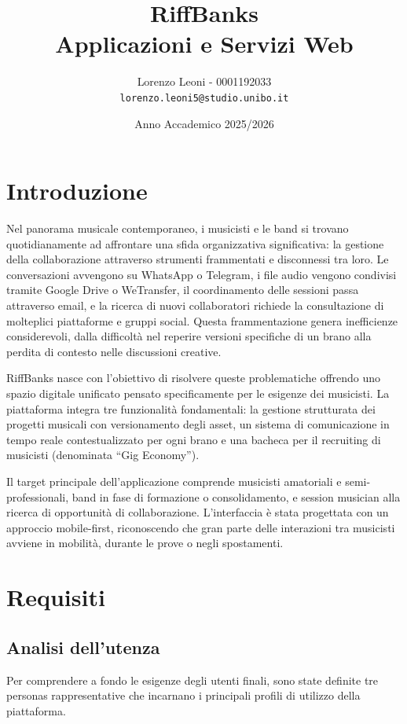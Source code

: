\documentclass{report}
\title{
    RiffBanks\\
    \large Applicazioni e Servizi Web
}
\author{Lorenzo Leoni - 0001192033 \\ \texttt{lorenzo.leoni5@studio.unibo.it}}
\date{Anno Accademico 2025/2026}
\begin{document}
\maketitle

\tableofcontents
\newpage

\chapter{Introduzione}

Nel panorama musicale contemporaneo, i musicisti e le band si trovano quotidianamente ad affrontare una sfida organizzativa significativa: la gestione della collaborazione attraverso strumenti frammentati e disconnessi tra loro. Le conversazioni avvengono su WhatsApp o Telegram, i file audio vengono condivisi tramite Google Drive o WeTransfer, il coordinamento delle sessioni passa attraverso email, e la ricerca di nuovi collaboratori richiede la consultazione di molteplici piattaforme e gruppi social. Questa frammentazione genera inefficienze considerevoli, dalla difficoltà nel reperire versioni specifiche di un brano alla perdita di contesto nelle discussioni creative.

RiffBanks nasce con l'obiettivo di risolvere queste problematiche offrendo uno spazio digitale unificato pensato specificamente per le esigenze dei musicisti. La piattaforma integra tre funzionalità fondamentali: la gestione strutturata dei progetti musicali con versionamento degli asset, un sistema di comunicazione in tempo reale contestualizzato per ogni brano e una bacheca per il recruiting di musicisti (denominata ``Gig Economy'').

Il target principale dell'applicazione comprende musicisti amatoriali e semi-professionali, band in fase di formazione o consolidamento, e session musician alla ricerca di opportunità di collaborazione. L'interfaccia è stata progettata con un approccio mobile-first, riconoscendo che gran parte delle interazioni tra musicisti avviene in mobilità, durante le prove o negli spostamenti.

\chapter{Requisiti}

\section{Analisi dell'utenza}

Per comprendere a fondo le esigenze degli utenti finali, sono state definite tre personas rappresentative che incarnano i principali profili di utilizzo della piattaforma.
\end{document}
